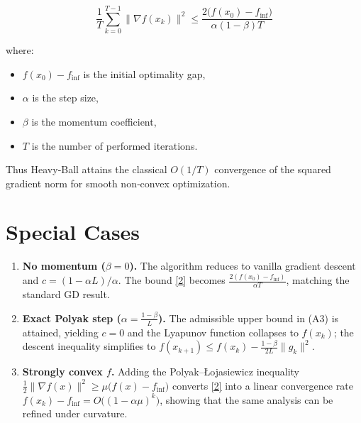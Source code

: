 \documentclass{article}
\begin{document}
\[
\boxed{
\frac{1}{T}\sum_{k=0}^{T-1}\|\nabla f(x_{k})\|^{2}
\le
\frac{2\bigl(f(x_{0})-f_{\inf}\bigr)}{\alpha(1-\beta)T}
}
\]

where:
\begin{itemize}
\item $f(x_{0})-f_{\inf}$ is the initial optimality gap,
\item $\alpha$ is the step size,
\item $\beta$ is the momentum coefficient,
\item $T$ is the number of performed iterations.
\end{itemize}
Thus Heavy‑Ball attains the classical $O(1/T)$ convergence of the squared gradient norm for smooth non‑convex optimization.

\section*{Special Cases}
\begin{enumerate}
\item \textbf{No momentum ($\beta=0$).}  The algorithm reduces to vanilla gradient descent and $c=(1-\alpha L)/\alpha$. The bound \eqref{2} becomes $\frac{2(f(x_{0})-f_{\inf})}{\alpha T}$, matching the standard GD result.
\item \textbf{Exact Polyak step ($\alpha = \frac{1-\beta}{L}$).}  The admissible upper bound in (A3) is attained, yielding $c=0$ and the Lyapunov function collapses to $f(x_{k})$; the descent inequality simplifies to $f(x_{k+1})\le f(x_{k})-\frac{1-\beta}{2L}\|g_{k}\|^{2}$.
\item \textbf{Strongly convex $f$.}  Adding the Polyak–Łojasiewicz inequality $\frac{1}{2}\|\nabla f(x)\|^{2}\ge\mu\bigl(f(x)-f_{\inf}\bigr)$ converts \eqref{2} into a linear convergence rate $f(x_{k})-f_{\inf}=O\bigl((1-\alpha\mu)^{k}\bigr)$, showing that the same analysis can be refined under curvature.
\end{enumerate}
\end{document}
